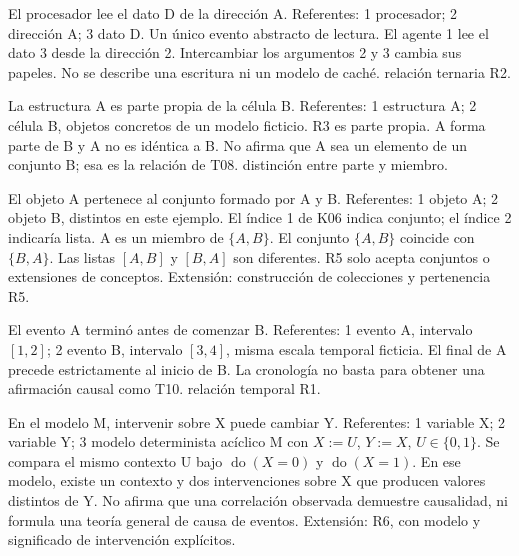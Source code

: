  {El procesador lee el dato D de la dirección A.}
 {}
 {Referentes: 1 procesador; 2 dirección A; 3 dato D. Un único evento abstracto de lectura.}
 {El agente 1 lee el dato 3 desde la dirección 2.}
 {Intercambiar los argumentos 2 y 3 cambia sus papeles. No se describe una escritura ni un modelo de caché.}
 {relación ternaria R2.}

 {La estructura A es parte propia de la célula B.}
 {}
 {Referentes: 1 estructura A; 2 célula B, objetos concretos de un modelo ficticio. R3 es parte propia.}
 {A forma parte de B y A no es idéntica a B.}
 {No afirma que A sea un elemento de un conjunto B; esa es la relación de T08.}
 {distinción entre parte y miembro.}

 {El objeto A pertenece al conjunto formado por A y B.}
 {}
 {Referentes: 1 objeto A; 2 objeto B, distintos en este ejemplo. El índice 1 de K06 indica conjunto; el índice 2 indicaría lista.}
 {A es un miembro de \(\{A,B\}\).}
 {El conjunto \(\{A,B\}\) coincide con \(\{B,A\}\). Las listas \([A,B]\) y \([B,A]\) son diferentes. R5 solo acepta conjuntos o extensiones de conceptos.}
 {Extensión: construcción de colecciones y pertenencia R5.}

 {El evento A terminó antes de comenzar B.}
 {}
 {Referentes: 1 evento A, intervalo \([1,2]\); 2 evento B, intervalo \([3,4]\), misma escala temporal ficticia.}
 {El final de A precede estrictamente al inicio de B.}
 {La cronología no basta para obtener una afirmación causal como T10.}
 {relación temporal R1.}

 {En el modelo M, intervenir sobre X puede cambiar Y.}
 {}
 {Referentes: 1 variable X; 2 variable Y; 3 modelo determinista acíclico M con \(X:=U\), \(Y:=X\), \(U\in\{0,1\}\). Se compara el mismo contexto U bajo \(\operatorname{do}(X=0)\) y \(\operatorname{do}(X=1)\).}
 {En ese modelo, existe un contexto y dos intervenciones sobre X que producen valores distintos de Y.}
 {No afirma que una correlación observada demuestre causalidad, ni formula una teoría general de causa de eventos.}
 {Extensión: R6, con modelo y significado de intervención explícitos.}

